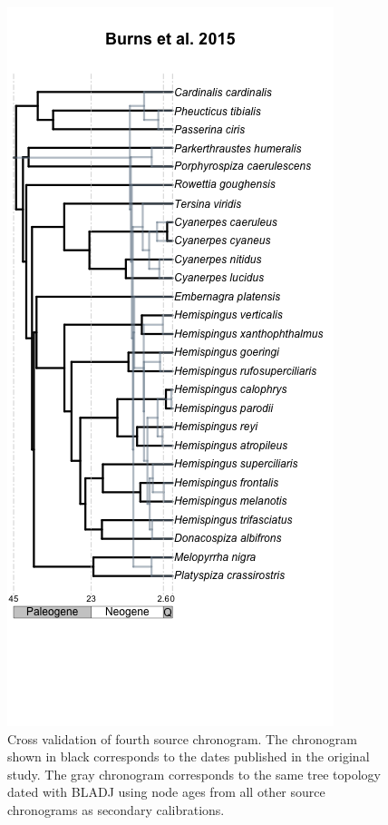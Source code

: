 \documentclass[
  english,
  man]{apa6}
\begin{document}
\begin{figure}[!h]
\includegraphics{../figures/figure-cross-validation/cross_validation_4.png}
\caption{Cross validation of fourth source chronogram. The chronogram shown in black corresponds to the dates published in the original study. The gray chronogram corresponds to the same tree topology dated with BLADJ using node ages from all other source chronograms as secondary calibrations.}
\label{fig:cv4}
\end{figure}
\end{document}
